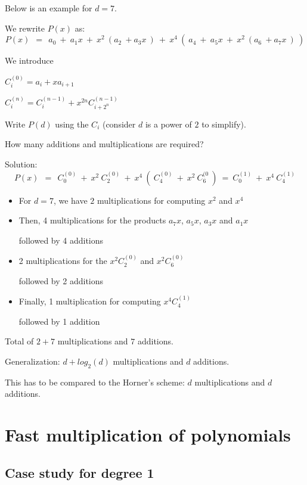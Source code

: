 \documentclass{article}[12pt]
\begin{document}
Below is an example for $d=7$.

We rewrite $P(x)$ as:
\[
P(x) \ \ = \ \ a_0 \ + \ a_1 x \ + \ x^2 \ ( a_2  \ + a_3 x \ ) \ + 
\ x^4 \ ( \ a_4 \ + \ a_5 x \ + \ x^2 \ ( a_6  \ + a_7 x \ ) \ )
\]

%

We introduce 

$C_i^{(0)} = a_i + x a_{i+1}$ 

$C_i^{(n)} = C_i^{(n-1)} + x^{2n} C_{i+2^n}^{(n-1)}$ 
\bigskip

Write $P(d)$ using the $C_i$ (consider $d$ is a power of $2$ to simplify).

How many additions and multiplications are required?
\bigskip

Solution:
\[
P(x) \ \ = \ \ C_{0}^{(0)} \ + \ x^2 \ C_2^{(0)} \ + 
\ x^4 \ ( \ C_4^{(0)} \ + \ x^2 \ C_6^{(0} \ )
\ = \ C_0^{(1)} \ + \ x^4 \ C_4^{(1)} 
\]

\begin{itemize}
\item
For $d=7$, we have $2$ multiplications for computing $x^2$ and $x^4$
\item
Then, 4 multiplications for the products $a_7 x$,  $a_5 x$, $a_3 x$ and $a_1 x$

followed by 4 additions
\item
2 multiplications for the $x^2 C_2^{(0)}$ and  $x^2 C_6^{(0)}$

followed by 2 additions
\item
Finally, 1 multiplication for computing $x^4 C_4^{(1)}$

followed by 1 addition
\end{itemize}

Total of $2 + 7$ multiplications and $7$ additions.

Generalization: 
$d + log_2(d)$ multiplications and $d$ additions.
\bigskip

This has to be compared to the Horner's scheme: $d$ multiplications and $d$ additions.


\section{Fast multiplication of polynomials}


\subsection{Case study for degree 1}
\end{document}
